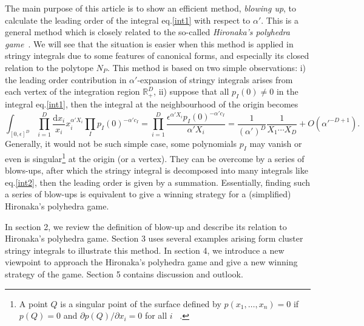 \documentclass[12pt]{article}
\theoremstyle{definition}
\theoremstyle{plain}
\newcommand{\dif}{\mathrm{d}} %
\begin{document}
The main purpose of this article is to show an efficient method, {\it{blowing up}}, %
to calculate the leading order of the integral eq.\eqref{int1} with respect to $\alpha'$. This is a general method which is closely related to the so-called \emph{Hironaka's polyhedra game}~\cite{hironaka1967}. We will see that the situation is easier when this method is applied in stringy integrals due to some features of canonical forms, and especially its closed relation to the polytope $N_{P}$. This method is based on two simple observations: i) the leading order contribution in $\alpha'$-expansion of stringy integrals arises from each vertex of the integration region $\mathbb{R}_{+}^{D}$, ii) suppose that all $p_I(0)\neq 0$ in the integral eq.\eqref{int1}, then the integral at the neighbourhood of the origin becomes 
\begin{equation}\label{int2}
	\int_{[0,\epsilon]^D}\prod_{i=1}^D\frac{\dif x_i}{x_i}x_i^{\alpha' X_i} \prod_{I}p_{I}(0)^{-\alpha' c_{I}}
	=\prod_{i=1}^D\frac{\epsilon^{\alpha' X_i}p_{I}(0)^{-\alpha' c_{I}}}{\alpha' X_i}
	= \frac{1}{(\alpha')^D}\frac{1}{X_1\cdots X_D}+O(\alpha'^{-D+1}).
\end{equation}
Generally, it would not be such simple case, some polynomials $p_{I}$ may vanish or even is singular\footnote{A point $Q$ is a singular point of the surface defined by $p(x_{1},\dots,x_{n})=0$ if $p(Q)=0$ and $\partial p(Q)/\partial x_{i} =0$ for all $i$~%
\cite{shafarevich1994basic}. } at the origin (or a vertex).
They can be overcome by a series of blows-ups, after which the stringy integral is decomposed into many integrals like eq.\eqref{int2}, then the leading order is given by a summation. %
Essentially, finding such a series of blow-ups is equivalent to give a winning strategy for a (simplified) Hironaka's polyhedra game.


In section 2, we review the definition of blow-up and describe its relation to Hironaka's polyhedra game.
Section 3 uses several examples arising form cluster stringy integrals to illustrate this method.
In section 4, we introduce a new viewpoint to approach the Hironaka's polyhedra game and give a new winning strategy of the game.
Section 5 contains discussion and outlook. 
\end{document}
